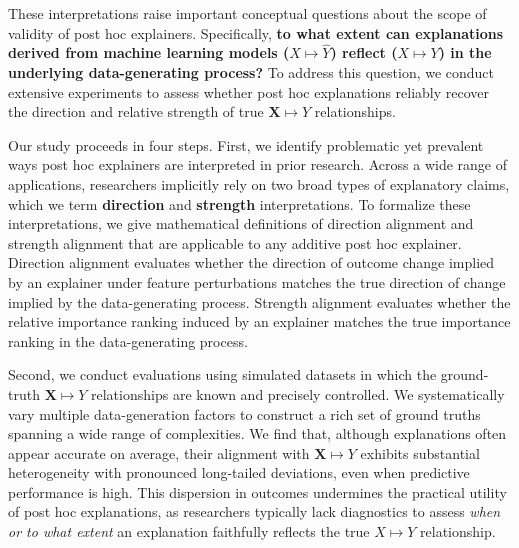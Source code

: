 \documentclass[11pt]{article}
\begin{document}
These interpretations raise important conceptual questions about the scope of validity of post hoc explainers. Specifically, \textbf{to what extent can explanations derived from machine learning models ($X \mapsto \hat{Y}$) reflect ($X \mapsto Y$) in the underlying data-generating process?} To address this question, we conduct extensive experiments to assess whether post hoc explanations reliably recover the direction and relative strength of true $\mathbf{X}\mapsto Y$ relationships. 


Our study proceeds in four steps. First, we identify problematic yet prevalent ways post hoc explainers are interpreted in prior research. Across a wide range of applications, researchers implicitly rely on two broad types of explanatory claims, which we term \textbf{direction} and \textbf{strength} interpretations. To formalize these interpretations, we give mathematical definitions of direction alignment and strength alignment that are applicable to any additive post hoc explainer. Direction alignment evaluates whether the direction of outcome change implied by an explainer under feature perturbations matches the true direction of change implied by the data-generating process. Strength alignment evaluates whether the relative importance ranking induced by an explainer matches the true importance ranking in the data-generating process. %

Second, we conduct evaluations using simulated datasets in which the ground-truth $\mathbf{X} \mapsto Y$ relationships are known and precisely controlled. We systematically vary multiple data-generation factors to construct a rich set of ground truths spanning a wide range of complexities.
We find that, although explanations often appear accurate on average, their alignment with $\mathbf{X} \mapsto Y$ exhibits substantial heterogeneity with pronounced long-tailed deviations, even when predictive performance is high. This dispersion in outcomes undermines the practical utility of post hoc explanations, as researchers typically lack diagnostics to assess \textit{when or to what extent} an explanation faithfully reflects the true $X \mapsto Y$ relationship.
\end{document}

